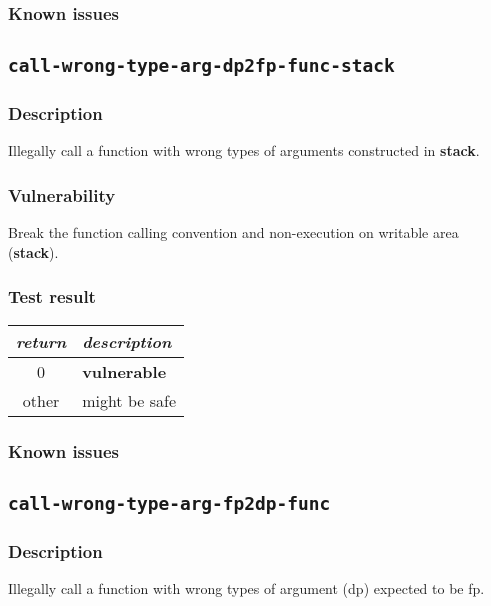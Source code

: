 \documentclass[a4paper]{book}
\begin{document}
\subsubsection{Known issues}

\newpage

\subsection{\texttt{call-wrong-type-arg-dp2fp-func-stack}}\label{test-call-wrong-type-arg-dp2fp-func-stack}

\subsubsection{Description}
Illegally call a function with wrong types of arguments constructed in \textbf{stack}.

\subsubsection{Vulnerability}
Break the function calling convention and non-execution on writable area (\textbf{stack}).

\subsubsection{Test result}
\begin{tabular}{cl}
  \toprule
  \emph{return}  & \emph{description} \\
  \midrule
  0              & \textbf{vulnerable} \\
  other          & might be safe \\
  \bottomrule
\end{tabular}

\subsubsection{Known issues}


\newpage

\subsection{\texttt{call-wrong-type-arg-fp2dp-func}}\label{test-call-wrong-type-arg-fp2dp-func}

\subsubsection{Description}
Illegally call a function with wrong types of argument (dp)  expected to be fp.
\end{document}
